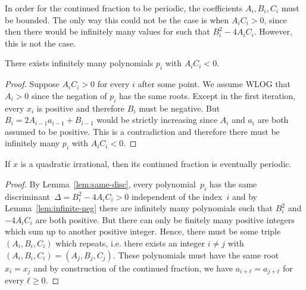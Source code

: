 In order for the continued fraction to be periodic, the coefficients $A_i, B_i, C_i$ must be bounded.
The only way this could not be the case is when $A_i C_i > 0$,
since then there would be infinitely many values for such that $B_i^2 - 4 A_i C_i$.
However, this is not the case.

\begin{lemma}
  \label{lem:infinite-neg}
  There exists infinitely many polynomials $p_i$ with $A_i C_i < 0$.
\end{lemma}

\begin{proof}
  Suppose $A_i C_i > 0$ for every $i$ after some point.
  We assume WLOG that $A_i > 0$ since the negation of $p_i$ has the same roots.
  Except in the first iteration, every $x_i$ is positive and therefore $B_i$ must be negative.
  But $B_i = 2 A_{i-1} a_{i-1} + B_{i-1}$ would be strictly increasing since
  $A_i$ and $a_i$ are both assumed to be positive.
  This is a contradiction and therefore there must be infinitely many $p_i$ with $A_i C_i < 0$.
\end{proof}

\begin{theorem}
  If $x$ is a quadratic irrational, then its continued fraction is eventually periodic.
\end{theorem}

\begin{proof}
  By Lemma~\ref{lem:same-disc}, every polynomial~$p_i$ has the same
  discriminant~$Δ = B_i^2 - 4 A_i C_i > 0$ independent of the index~$i$
  and by Lemma~\ref{lem:infinite-neg} there are infinitely many polynomials
  such that $B_i^2$ and $-4 A_i C_i$ are both positive.
  But there can only be finitely many positive integers which sum up to another positive integer.
  Hence, there must be some triple $(A_i, B_i, C_i)$ which repeats, i.e. there
  exists an integer $i ≠ j$ with $(A_i, B_i, C_i) = (A_j, B_j, C_j)$.
  These polynomials must have the same root $x_i = x_j$ and by construction of
  the continued fraction, we have $a_{i+ℓ} = a_{j+ℓ}$ for every $ℓ ≥ 0$.
\end{proof}
